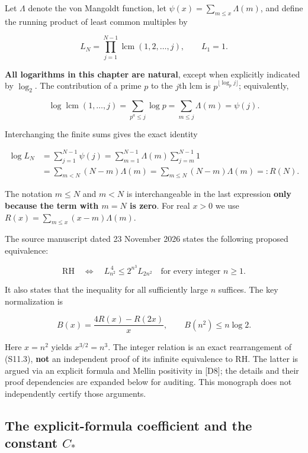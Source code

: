 \documentclass[
  10pt,
  a4paper,
  10pt,
  oneside,
  openany]{book}
\begin{document}
Let \(\Lambda\) denote the von Mangoldt function, let
\(\psi(x)=\sum_{m\le x}\Lambda(m)\), and define the running product of
least common multiples by

\[
L_N=\prod_{j=1}^{N-1}\operatorname{lcm}(1,2,\ldots,j),
\qquad L_1=1.
\tag{S11.1}\label{eq:S11.1}
\]

\textbf{All logarithms in this chapter are natural}, except when
explicitly indicated by \(\log_2\). The contribution of a prime \(p\) to
the \(j\)th lcm is \(p^{\lfloor\log_p j\rfloor}\); equivalently,

\[
\log\operatorname{lcm}(1,\ldots,j)
=\sum_{p^a\le j}\log p=\sum_{m\le j}\Lambda(m)=\psi(j).
\]

Interchanging the finite sums gives the exact identity

\[
\begin{aligned}
\log L_N
 &=\sum_{j=1}^{N-1}\psi(j)
 =\sum_{m=1}^{N-1}\Lambda(m)\sum_{j=m}^{N-1}1\\
 &=\sum_{m<N}(N-m)\Lambda(m)
 =\sum_{m\le N}(N-m)\Lambda(m)=:R(N).
\end{aligned}
\tag{S11.2}\label{eq:S11.2}
\]

The notation \(m\le N\) and \(m<N\) is interchangeable in the last
expression \textbf{only because the term with \(m=N\) is zero}. For real
\(x>0\) we use \(R(x)=\sum_{m\le x}(x-m)\Lambda(m)\).

The source manuscript dated 23 November 2026 states the following
proposed equivalence:

\[
\boxed{\qquad
\mathrm{RH}\quad\Longleftrightarrow\quad
L_{n^2}^{\,4}\le 2^{n^3}L_{2n^2}
\quad\text{for every integer }n\ge1.
\qquad}
\tag{S11.3}\label{eq:S11.3}
\]

It also states that the inequality for all sufficiently large \(n\)
suffices. The key normalization is

\[
B(x)=\frac{4R(x)-R(2x)}{x},
\qquad B(n^2)\le n\log2.
\tag{S11.4}\label{eq:S11.4}
\]

Here \(x=n^2\) yields \(x^{3/2}=n^3\). The integer relation is an exact
rearrangement of (S11.3), \textbf{not} an independent proof of its
infinite equivalence to RH. The latter is argued via an explicit formula
and Mellin positivity in {[}D8{]}; the details and their proof
dependencies are expanded below for auditing. This monograph does not
independently certify those arguments.

\subsection{\texorpdfstring{The explicit-formula coefficient and the
constant
\(C_*\)}{The explicit-formula coefficient and the constant C\_*}}\label{the-explicit-formula-coefficient-and-the-constant-c_}
\end{document}
